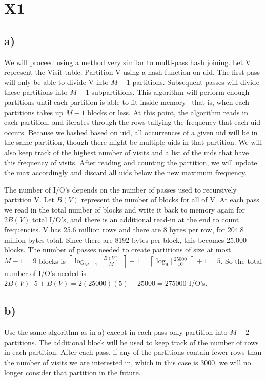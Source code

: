 \documentclass{article}
\begin{document}
	\vspace*{2mm}
\section*{X1}
\subsection*{a)}
We will proceed using a method very similar to multi-pass hash joining. Let V represent the Visit table. Partition V using a hash function on uid. The first pass will only be able to divide V into $M-1$ partitions. Subsequent passes will divide these partitions into $M-1$ subpartitions. This algorithm will perform enough partitions until each partition is able to fit inside memory– that is, when each partitions takes up $M-1$ blocks or less. At this point, the algorithm reads in each partition, and iterates through the rows tallying the frequency that each uid occurs. Because we hashed based on uid, all occurrences of a given uid will be in the same partition, though there might be multiple uids in that partition. We will also keep track of the highest number of visits and a list of the uids that have this frequency of visits. After reading and counting the partition, we will update the max accordingly and discard all uids below the new maximum frequency.

The number of I/O's depends on the number of passes used to recursively partition V. Let $B(V)$ represent the number of blocks for all of V. At each pass we read in the total number of blocks and write it back to memory again for $2B(V)$ total I/O's, and there is an additional read-in at the end to count frequencies. V has 25.6 million rows and there are 8 bytes per row, for 204.8 million bytes total. Since there are 8192 bytes per block, this becomes 25,000 blocks. The number of passes needed to create partitions of size at most $M-1 = 9$ blocks is $\left\lceil\log_{M-1}\lceil\frac{B(V)}{M}\rceil\right\rceil + 1 = \left\lceil\log_{9}\lceil\frac{25000}{10}\rceil\right\rceil + 1 = 5$. So the total number of I/O's needed is $2B(V)\cdot5 + B(V) = 2(25000)(5)+25000 = 275000$ I/O's.

\subsection*{b)}
Use the same algorithm as in a) except in each pass only partition into $M-2$ partitions. The additional block will be used to keep track of the number of rows in each partition. After each pass, if any of the partitions contain fewer rows than the number of visits we are interested in, which in this case is 3000, we will no longer consider that partition in the future. 
\end{document}
